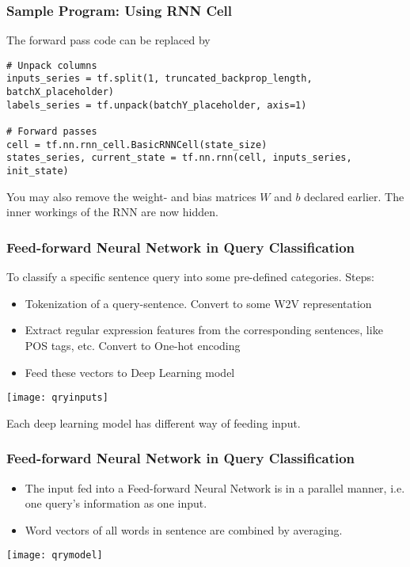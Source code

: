 \begin{frame}[fragile] \frametitle{Sample Program: Using RNN Cell}
The forward pass code can be replaced by

\begin{lstlisting}
# Unpack columns
inputs_series = tf.split(1, truncated_backprop_length, batchX_placeholder)
labels_series = tf.unpack(batchY_placeholder, axis=1)

# Forward passes
cell = tf.nn.rnn_cell.BasicRNNCell(state_size)
states_series, current_state = tf.nn.rnn(cell, inputs_series, init_state)
\end{lstlisting}
You may also remove the weight- and bias matrices $W$ and $b$ declared earlier. The inner workings of the RNN are now hidden.
\end{frame}


\begin{frame}[fragile] \frametitle{Feed-forward Neural Network in Query Classification}
To classify a specific sentence query into some pre-defined categories. Steps:

\begin{itemize}
\item Tokenization of a query-sentence. Convert to some W2V representation
\item Extract regular expression features from the corresponding sentences, like POS tags, etc. Convert to One-hot encoding
\item Feed these vectors to Deep Learning model
\end{itemize}
\begin{center}
\texttt{[image: qryinputs]}
\end{center}
Each deep learning model has different way of feeding input.
\end{frame}


\begin{frame}[fragile] \frametitle{Feed-forward Neural Network in Query Classification}
\begin{itemize}
\item The input fed into a Feed-forward Neural Network is in a parallel manner, i.e. one query's information as one input. 
\item Word vectors of all words in sentence are combined by averaging.
\end{itemize}
\begin{center}
\texttt{[image: qrymodel]}
\end{center}
\end{frame}


